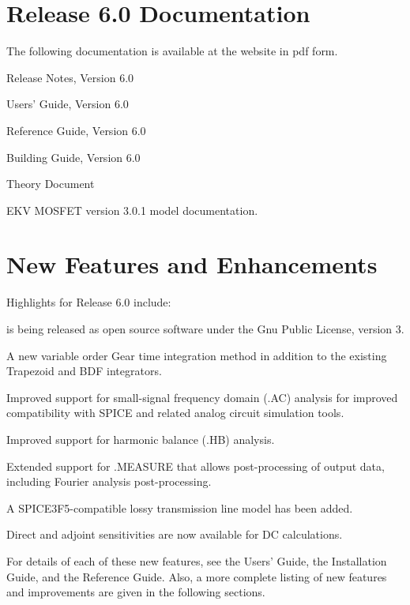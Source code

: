 \documentclass[11pt,report,strict]{SANDreport}
\begin{document}
\section{\Xyce{} Release 6.0 Documentation}
The following \Xyce{} documentation is available at the \Xyce{}
website in pdf form.
\begin{XyceItemize}
\item \Xyce{} Release Notes, Version 6.0
\item \Xyce{} Users' Guide, Version 6.0
\item \Xyce{} Reference Guide, Version 6.0
\item \Xyce{} Building Guide, Version 6.0
\item \Xyce{} Theory Document
\item EKV MOSFET version 3.0.1 model documentation.
\end{XyceItemize}

\section{New Features and Enhancements}

Highlights for \Xyce{} Release 6.0 include:

\begin{XyceItemize}
\item \Xyce{} is being released as open source software under the Gnu Public License, version 3.
\item A new variable order Gear time integration method in addition to the existing Trapezoid and BDF integrators.
\item Improved support for small-signal frequency domain (.AC) analysis for improved compatibility with SPICE and related analog circuit simulation tools.
\item Improved support for harmonic balance (.HB) analysis.
\item Extended support for .MEASURE that allows post-processing of output data, including Fourier analysis post-processing.
\item A SPICE3F5-compatible lossy transmission line model has been added.
\item Direct and adjoint sensitivities are now available for DC calculations.
\end{XyceItemize}

For details of each of these new features, see the \Xyce{} Users'
Guide, the \Xyce{} Installation Guide, and the \Xyce{} Reference Guide.  Also, a more complete listing of
new features and improvements are given in the following sections.
\end{document}
